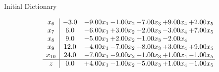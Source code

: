 \documentclass[8pt]{article}
\begin{document}
Initial Dictionary 

\[\begin{array}{c| c c@{\hskip 2pt} c@{\hskip 2pt} c@{\hskip 2pt} c@{\hskip 2pt} c@{\hskip 2pt} }
 x_{6}   &  -3.0 & -9.00 x_{1} & -1.00 x_{2} & -7.00 x_{3} & +  9.00 x_{4} & +  2.00 x_{5}\\
 x_{7}   &  6.0 & -6.00 x_{1} & +  3.00 x_{2} & +  2.00 x_{3} & -3.00 x_{4} & +  7.00 x_{5}\\
 x_{8}   &  9.0 & -5.00 x_{1} & +  2.00 x_{2} & +  1.00 x_{3} & -2.00 x_{4} &   \\
 x_{9}   &  12.0 & -4.00 x_{1} & -7.00 x_{2} & +  8.00 x_{3} & +  3.00 x_{4} & +  9.00 x_{5}\\
 x_{10}   &  24.0 & -7.00 x_{1} & -9.00 x_{2} & +  1.00 x_{3} & +  1.00 x_{4} & -1.00 x_{5}\\
\hline
z    &  0.0 & +  4.00 x_{1} & -1.00 x_{2} & -5.00 x_{3} & +  1.00 x_{4} & -1.00 x_{5}\\
\end{array}\]
\end{document}
